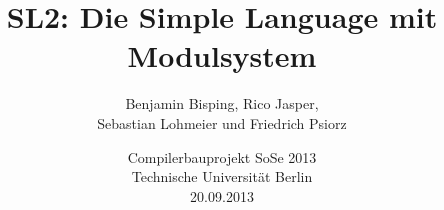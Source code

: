\documentclass{beamer}
\title{SL2: Die Simple Language mit Modulsystem}
\author{Benjamin Bisping, Rico Jasper,\\Sebastian Lohmeier und Friedrich Psiorz}
\date{Compilerbauprojekt SoSe 2013\\
Technische Universität Berlin\\
20.09.2013}
\begin{document}
\begin{frame}
\titlepage
\end{frame}

\begin{frame}
\tableofcontents
\end{frame}











\end{document}
